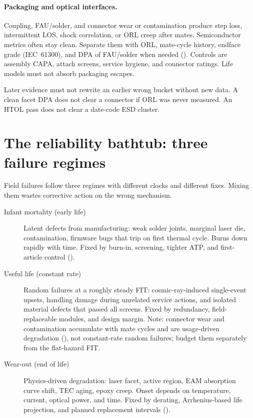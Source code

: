 \paragraph{Packaging and optical interfaces.}
Coupling, FAU/solder, and connector wear or contamination produce step loss,
intermittent LOS, shock correlation, or ORL creep after mates. Semiconductor
metrics often stay clean. Separate them with ORL, mate-cycle history, endface
grade (IEC~61300), and DPA of FAU/solder when needed
(). Controls are assembly
CAPA, attach screens, service hygiene, and connector ratings. Life models must
not absorb packaging escapes.

Later evidence must not rewrite an earlier wrong bucket without new data. A
clean facet DPA does not clear a connector if ORL was never measured. An HTOL
pass does not clear a date-code ESD cluster.

\section{The reliability bathtub: three failure regimes}
\label{sec:bathtub}

Field failures follow three regimes with different clocks and different fixes.
Mixing them wastes corrective action on the wrong mechanism.

\begin{description}
\item[Infant mortality (early life)] Latent defects from manufacturing: weak
      solder joints, marginal laser die, contamination, firmware bugs that trip on
      first thermal cycle. Burns down rapidly with time. Fixed by burn-in,
      screening, tighter ATP, and first-article control ().
\item[Useful life (constant rate)] Random failures at a roughly steady FIT:
      cosmic-ray-induced single-event upsets, handling damage during unrelated
      service actions, and isolated material defects that passed all screens. Fixed
      by redundancy, field-replaceable modules, and design margin. Note: connector
      wear and contamination accumulate with mate cycles and are usage-driven
      degradation (), not constant-rate random
      failures; budget them separately from the flat-hazard FIT.
\item[Wear-out (end of life)] Physics-driven degradation: laser facet, active
      region, EAM absorption curve shift, TEC aging, epoxy creep. Onset depends
      on temperature, current, optical power, and time. Fixed by derating,
      Arrhenius-based life projection, and planned replacement intervals
      ().
\end{description}

